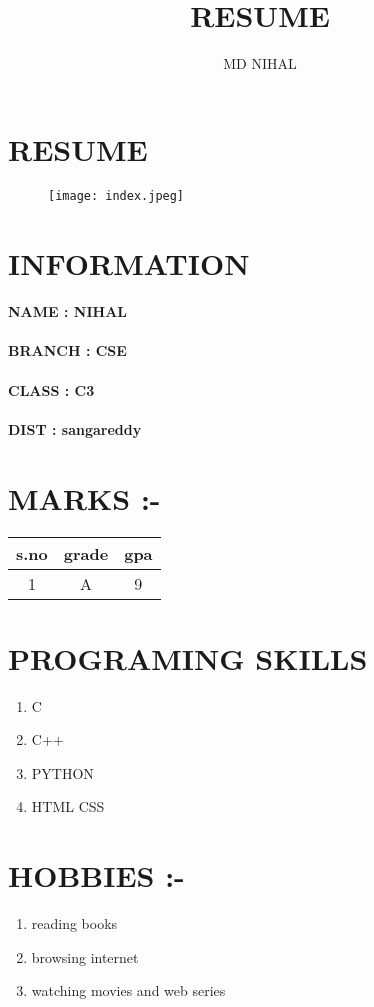 \documentclass{article}
\title{RESUME}
\author{ MD NIHAL}
\begin{document}
\section{\centering RESUME}
\begin{figure}
\centering
 \texttt{[image: index.jpeg]}
\end{figure}
\section{\centering  \color{red}  INFORMATION}
\paragraph{NAME   :  \color{blue} NIHAL } 
\paragraph{BRANCH  :  \color{blue} CSE } 
\paragraph{CLASS  :  \color{blue} C3 } 
\paragraph{DIST :  \color{blue} sangareddy }
\section{\centering \color{red} MARKS :-}
  \begin{tabular}{|c|c|c|}
\hline
    \color{red} s.no  &\color{red} grade & \color{red}gpa \\
\hline
     1 & A & 9 \\
\hline
\end{tabular}
\section{ \centering \color{red}  PROGRAMING SKILLS} 

\begin{enumerate}
\item C
\item C++
\item PYTHON
\item HTML CSS
\end{enumerate}
\section{\centering \color{red} HOBBIES :-}
\begin{enumerate}
\item reading books
\item browsing internet
\item watching movies and web series
\end{enumerate}
\end{document}
